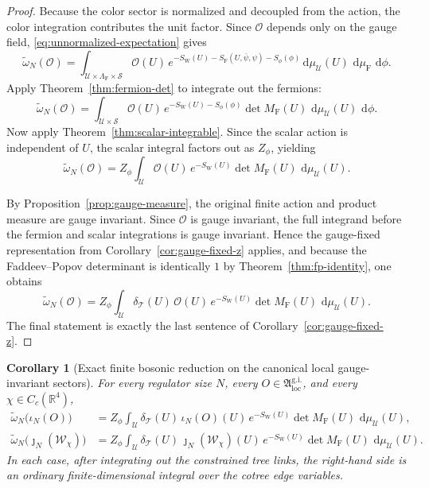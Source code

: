\documentclass[11pt]{article}
\newtheorem{corollary}[theorem]{Corollary}
\theoremstyle{remark}
\newcommand{\R}{\mathbb R}
\newcommand{\mcT}{\mathcal T}
\newcommand{\mcU}{\mathscr U}
\newcommand{\mcS}{\mathscr S}
\newcommand{\mcO}{\mathcal O}
\newcommand{\dd}{\,\mathrm d}
\begin{document}
\begin{proof}
Because the color sector is normalized and decoupled from the action, the
color integration contributes the unit factor.  Since \(\mcO\) depends only on
the gauge field, \eqref{eq:unnormalized-expectation} gives
\[
\widetilde\omega_N(\mcO)
=
\int_{\mcU\times\Lambda_{\mathrm F}\times\mcS}
\mcO(U)\,e^{-S_{\mathrm W}(U)-S_{\mathrm F}(U,\bar\psi,\psi)-S_\phi(\phi)}
\dd\mu_{\mcU}(U)\,\dd\mu_{\mathrm F}\,\dd\phi.
\]
Apply Theorem~\ref{thm:fermion-det} to integrate out the fermions:
\[
\widetilde\omega_N(\mcO)
=
\int_{\mcU\times\mcS}
\mcO(U)\,e^{-S_{\mathrm W}(U)-S_\phi(\phi)}\det M_{\mathrm F}(U)\,
\dd\mu_{\mcU}(U)\,\dd\phi.
\]
Now apply Theorem~\ref{thm:scalar-integrable}.  Since the scalar action is
independent of \(U\), the scalar integral factors out as \(Z_\phi\), yielding
\[
\widetilde\omega_N(\mcO)
=
Z_\phi
\int_{\mcU}
\mcO(U)\,e^{-S_{\mathrm W}(U)}\det M_{\mathrm F}(U)\,
\dd\mu_{\mcU}(U).
\]

By Proposition~\ref{prop:gauge-measure}, the original finite action and product
measure are gauge invariant.  Since \(\mcO\) is gauge invariant, the full
integrand before the fermion and scalar integrations is gauge invariant.  Hence
the gauge-fixed representation from Corollary~\ref{cor:gauge-fixed-z} applies,
and because the Faddeev--Popov determinant is identically \(1\) by
Theorem~\ref{thm:fp-identity}, one obtains
\[
\widetilde\omega_N(\mcO)
=
Z_\phi
\int_{\mcU}
\delta_{\mcT}(U)\,\mcO(U)\,e^{-S_{\mathrm W}(U)}\det M_{\mathrm F}(U)\,
\dd\mu_{\mcU}(U).
\]
The final statement is exactly the last sentence of
Corollary~\ref{cor:gauge-fixed-z}.
\end{proof}

\begin{corollary}[Exact finite bosonic reduction on the canonical local gauge-invariant sectors]
\label{cor:bosonic-reduction-local-sectors}
For every regulator size \(N\), every
\(O\in\mathfrak A_{\mathrm{loc}}^{\mathrm{g.i.}}\), and every
\(\chi\in C_c(\R^4)\),
\begin{align*}
\widetilde\omega_N\bigl(\iota_N(O)\bigr)
&=
Z_\phi
\int_{\mcU}
\delta_{\mcT}(U)\,\iota_N(O)(U)\,e^{-S_{\mathrm W}(U)}\det M_{\mathrm F}(U)\,
\dd\mu_{\mcU}(U),\\
\widetilde\omega_N\bigl(\jmath_N(\mathcal W_\chi)\bigr)
&=
Z_\phi
\int_{\mcU}
\delta_{\mcT}(U)\,\jmath_N(\mathcal W_\chi)(U)\,e^{-S_{\mathrm W}(U)}
\det M_{\mathrm F}(U)\,\dd\mu_{\mcU}(U).
\end{align*}
In each case, after integrating out the constrained tree links, the right-hand
side is an ordinary finite-dimensional integral over the cotree edge variables.
\end{corollary}
\end{document}
